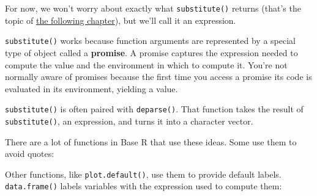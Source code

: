 For now, we won't worry about exactly what \texttt{substitute()} returns
(that's the topic of \hyperref[expressions]{the following chapter}),
but we'll call it an expression.

\texttt{substitute()} works because function arguments are represented
by a special type of object called a \textbf{promise}. A promise
captures the expression needed to compute the value and the environment
in which to compute it. You're not normally aware of promises because
the first time you access a promise its code is evaluated in its
environment, yielding a value. 

\texttt{substitute()} is often paired with \texttt{deparse()}. That
function takes the result of \texttt{substitute()}, an expression, and
turns it into a character vector. 

\begin{Shaded}
\begin{Highlighting}[]
\StringTok{ }\NormalTok{(}
\NormalTok{(}\NormalTok{:}\NormalTok{)}
\StringTok{ }\NormalTok{)}
\end{Highlighting}
\end{Shaded}

There are a lot of functions in Base R that use these ideas. Some use
them to avoid quotes:

\begin{Shaded}
\begin{Highlighting}[]
\NormalTok{(}\NormalTok{)}
\end{Highlighting}
\end{Shaded}

Other functions, like \texttt{plot.default()}, use them to provide
default labels. \texttt{data.frame()} labels variables with the
expression used to compute them:

\begin{Shaded}
\begin{Highlighting}[]
\StringTok{ }\NormalTok{:}
\StringTok{ }\NormalTok{letters[}\NormalTok{:}\NormalTok{]}
\NormalTok{(}
\end{Highlighting}
\end{Shaded}

